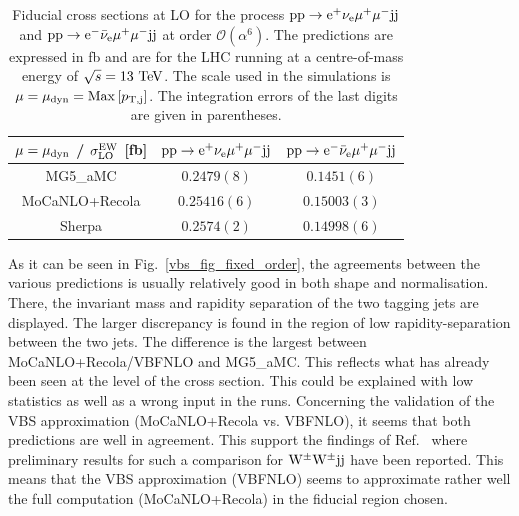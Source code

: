 \begin{table}
\begin{center} 
\begin{tabular}{ c | c | c }
 $\mu = \mu_{\rm dyn}$ / $\sigma_{\rm LO}^{\rm EW}$ [fb] & ${\rm p} {\rm p} \to {\rm e}^+  \nu_{\rm e}  \mu^+ \mu^- {\rm j} {\rm j}$  & ${\rm p} {\rm p} \to {\rm e}^-  \bar \nu_{\rm e}  \mu^+ \mu^- {\rm j} {\rm j}$  \\
  \hline\hline
  {\sc MG5\_aMC}                  & $0.2479(8)$  & $0.1451(6)$   \\
  {\sc MoCaNLO}+{\sc Recola}      & $0.25416(6)$  & $0.15003(3)$  \\
{\sc Sherpa}                      & $0.2574(2)$  & $0.14998(6)$   \\
  \hline
\end{tabular}
\end{center}
\caption{
Fiducial cross sections at LO for the process ${\rm p}{\rm p}\to{\rm e}^+\nu_{\rm e}\mu^+\mu^-{\rm j}{\rm j}$ and ${\rm p}{\rm p}\to{\rm e}^-\bar\nu_{\rm e}\mu^+\mu^-{\rm j}{\rm j}$ at order $\mathcal{O} (\alpha^6)$.
The predictions are expressed in fb and are for the LHC running at a centre-of-mass energy of $\sqrt{s}=13 {\rm~TeV}$.
The scale used in the simulations is $\mu = \mu_{\rm dyn} = {\rm Max}\left[p_{\rm T, j}\right]$.
The integration errors of the last digits are given in parentheses.}
\label{table:xsectLOdyn}
\end{table}

As it can be seen in Fig.~\ref{vbs_fig_fixed_order}, the agreements between the various predictions is usually relatively good in both shape and normalisation.
There, the invariant mass and rapidity separation of the two tagging jets are displayed.
The larger discrepancy is found in the region of low rapidity-separation between the two jets.
The difference is the largest between {\sc MoCaNLO}+{\sc Recola}/{\sc VBFNLO} and {\sc MG5\_aMC}.
This reflects what has already been seen at the level of the cross section.
This could be explained with low statistics as well as a wrong input in the runs.
Concerning the validation of the VBS approximation ({\sc MoCaNLO}+{\sc Recola} vs. {\sc VBFNLO}), it seems that both predictions are well in agreement.
This support the findings of Ref.~\cite{Anders:2018gfr} where preliminary results for such a comparison for ${\rm W}^\pm{\rm W}^\pm{\rm j}{\rm j}$ have been reported.
This means that the VBS approximation ({\sc VBFNLO}) seems to approximate rather well the full computation ({\sc MoCaNLO}+{\sc Recola}) in the fiducial region chosen.

